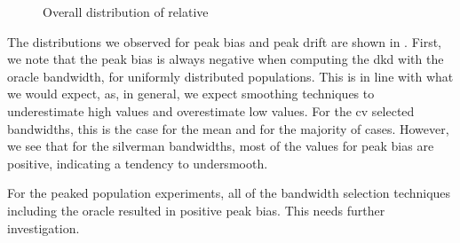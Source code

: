 \begin{figure}[htbp]
\begin{subfigure}[t]{0.45\textwidth}
        \label{fig:discussion:overall_peakdrift_boxplot:peak}
    \end{subfigure}
    \caption{Overall distribution of relative }
    \label{fig:discussion:overall_peakdrift_boxplot}
\end{figure}

The distributions we observed for \gls{peak bias} and \gls{peak drift} are shown in .
First, we note that the \gls{peak bias} is always negative when computing the \gls{dkd} with the \gls{oracle} bandwidth,
for uniformly distributed populations.
This is in line with what we would expect,
as, in general, we expect smoothing techniques to underestimate high values and overestimate low values.
For the \gls{cv} selected bandwidths, this is the case for the mean and for the majority of cases.
However, we see that for the \gls{silverman} bandwidths,
most of the values for \gls{peak bias} are positive,
indicating a tendency to undersmooth.

For the peaked population experiments, all of the bandwidth selection techniques including the \gls{oracle} resulted in positive \gls{peak bias}.
This needs further investigation.

